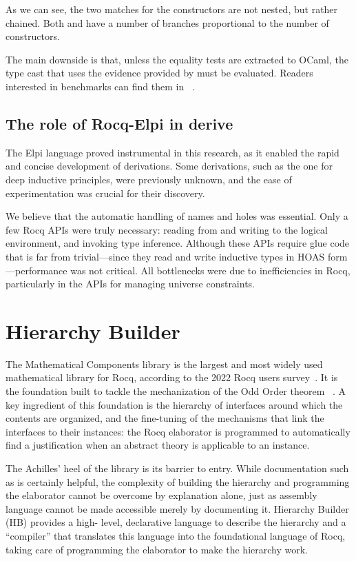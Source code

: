 \documentclass[a4paper, 11pt]{book}
\begin{document}
As we can see, the two matches for the constructors are not nested, but rather
chained. Both  and  have a number of branches
proportional to the number of constructors.


The main downside is that, unless the equality tests are extracted to OCaml,
the type cast that uses the evidence provided by  must be
evaluated. Readers interested in benchmarks can find them in
~\cite{gregoire:hal-03800154}.

\subsection{The role of Rocq-Elpi in derive}
The Elpi language proved instrumental in this research, as it enabled the
rapid and concise development of derivations. Some derivations, such as the one
for deep inductive principles, were previously unknown, and the ease of
experimentation was crucial for their discovery.

We believe that the automatic handling of names and holes was essential. Only a
few Rocq APIs were truly necessary: reading from and writing to the logical
environment, and invoking type inference. Although these APIs require glue code
that is far from trivial—since they read and write inductive types in HOAS
form—performance was not critical. All bottlenecks were due to inefficiencies
in Rocq, particularly in the APIs for managing universe constraints.


\section{Hierarchy Builder}\label{sec:hb}


The Mathematical Components library is the largest and most widely used
mathematical library for Rocq, according to the 2022 Rocq users
survey~\cite{dealmeidaborges_et_al:LIPIcs.ITP.2023.12}. It is the foundation
built to tackle the mechanization of the Odd Order theorem
~\cite{DBLP:conf/itp/GonthierAABCGRMOBPRSTT13}. A key ingredient of this
foundation is the hierarchy of interfaces around which the contents are
organized, and the fine-tuning of the mechanisms that link the interfaces to
their instances: the Rocq elaborator is programmed to automatically find a
justification when an abstract theory is applicable to an instance.

The Achilles' heel of the library is its barrier to entry. While documentation
such as \cite{assia_mahboubi_2022_7118596} is certainly helpful, the
complexity of building the hierarchy and programming the elaborator cannot be
overcome by explanation alone, just as assembly language cannot be made
accessible merely by documenting it. Hierarchy Builder (HB) provides a high-
level, declarative language to describe the hierarchy and a ``compiler'' that
translates this language into the foundational language of Rocq, taking care of
programming the elaborator to make the hierarchy work.
\end{document}
